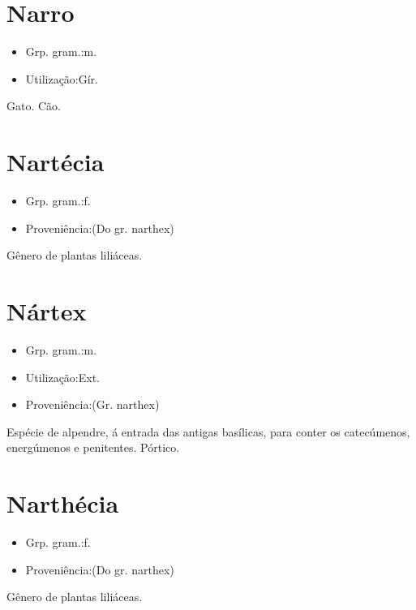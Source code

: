 \section{Narro}
\begin{itemize}
\item {Grp. gram.:m.}
\end{itemize}
\begin{itemize}
\item {Utilização:Gír.}
\end{itemize}
Gato.
Cão.
\section{Nartécia}
\begin{itemize}
\item {Grp. gram.:f.}
\end{itemize}
\begin{itemize}
\item {Proveniência:(Do gr. \textunderscore narthex\textunderscore )}
\end{itemize}
Gênero de plantas liliáceas.
\section{Nártex}
\begin{itemize}
\item {Grp. gram.:m.}
\end{itemize}
\begin{itemize}
\item {Utilização:Ext.}
\end{itemize}
\begin{itemize}
\item {Proveniência:(Gr. \textunderscore narthex\textunderscore )}
\end{itemize}
Espécie de alpendre, á entrada das antigas basílicas, para conter os catecúmenos, energúmenos e penitentes.
Pórtico.
\section{Narthécia}
\begin{itemize}
\item {Grp. gram.:f.}
\end{itemize}
\begin{itemize}
\item {Proveniência:(Do gr. \textunderscore narthex\textunderscore )}
\end{itemize}
Gênero de plantas liliáceas.
